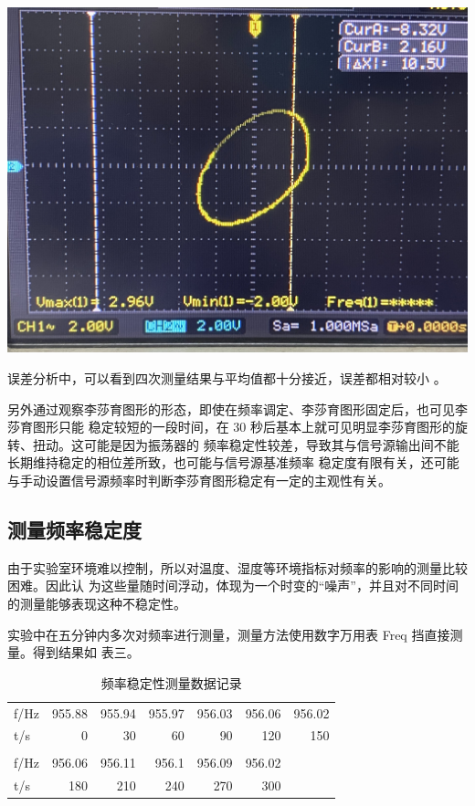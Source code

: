 \documentclass[a4paper,11pt,UTF8]{ctexart}
\begin{document}
	
	\includegraphics[width = \textwidth]{李萨如2.jpg}
	
	
	
	误差分析中，可以看到四次测量结果与平均值都十分接近，误差都相对较小
。
	
	
	另外通过观察李莎育图形的形态，即使在频率调定、李莎育图形固定后，也可见李莎育图形只能
	稳定较短的一段时间，在 30 秒后基本上就可见明显李莎育图形的旋转、扭动。这可能是因为振荡器的
	频率稳定性较差，导致其与信号源输出间不能长期维持稳定的相位差所致，也可能与信号源基准频率
	稳定度有限有关，还可能与手动设置信号源频率时判断李莎育图形稳定有一定的主观性有关。

	
\subsection{测量频率稳定度}

由于实验室环境难以控制，所以对温度、湿度等环境指标对频率的影响的测量比较困难。因此认
为这些量随时间浮动，体现为一个时变的“噪声”，并且对不同时间的测量能够表现这种不稳定性。


实验中在五分钟内多次对频率进行测量，测量方法使用数字万用表 Freq 挡直接测量。得到结果如
表三。

\begin{table}[htbp]
	\centering
	\caption{频率稳定性测量数据记录}
	\begin{tabular}{lrrrrrr}
		f/Hz  & 955.88 & 955.94 & 955.97 & 956.03 & 956.06 & 956.02 \\
		t/s   & 0     & 30    & 60    & 90    & 120   & 150 \\
		&       &       &       &       &       &  \\
		f/Hz  & 956.06 & 956.11 & 956.1 & 956.09 & 956.02 &  \\
		t/s   & 180   & 210   & 240   & 270   & 300   &  \\
	\end{tabular}%
	\label{tab:addlabel}%
\end{table}%
\end{document}
